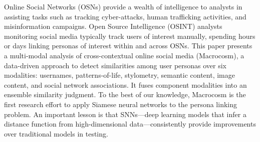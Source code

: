 Online Social Networks (OSNs) provide a wealth of intelligence to analysts in assisting tasks such as tracking cyber-attacks, human trafficking activities, and misinformation campaigns. Open Source Intelligence (OSINT) analysts monitoring social media typically track users of interest manually, spending hours or days linking personas of interest within and across OSNs. This paper presents a multi-modal analysis of cross-contextual online social media (Macrocosm), a data-driven approach to detect similarities among user personas over six modalities: usernames, patterns-of-life, stylometry, semantic content, image content, and social network associations. It fuses component modalities into an ensemble similarity judgment. To the best of our knowledge, Macrocosm is the first research effort to apply Siamese neural networks to the persona linking problem. An important lesson is that SNNs—deep learning models that infer a distance function from high-dimensional data—consistently provide improvements over traditional models in testing.